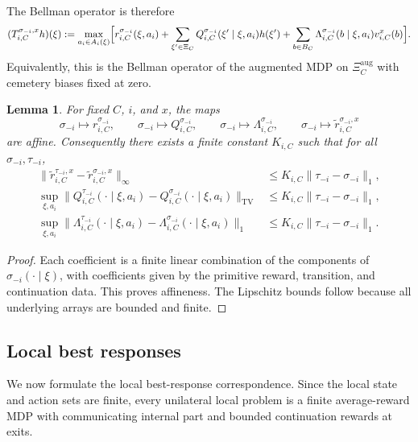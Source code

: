 \documentclass[12pt]{article}
\newtheorem{lemma}[theorem]{Lemma}
\theoremstyle{definition}
\newcommand{\1}{\mathbf{1}}
\begin{document}
The Bellman operator is therefore
\begin{equation}
\label{eq:Bellman-operator}
(T_{i,C}^{\sigma_{-i},x}h)(\xi)
:=
\max_{a_i\in A_i(\xi)}\Bigl[
 r_{i,C}^{\sigma_{-i}}(\xi,a_i)
 +\sum_{\xi'\in\Xi_C}Q_{i,C}^{\sigma_{-i}}(\xi'\mid\xi,a_i)h(\xi')
 +\sum_{b\in B_C}\Lambda_{i,C}^{\sigma_{-i}}(b\mid\xi,a_i)v_{i,C}^x(b)
 \Bigr].
\end{equation}
Equivalently, this is the Bellman operator of the augmented MDP on
$\Xi_C^{\mathrm{aug}}$ with cemetery biases fixed at zero.

\begin{lemma}
\label{lem:coeff-affine}
For fixed $C$, $i$, and $x$, the maps
\[
\sigma_{-i}\mapsto r_{i,C}^{\sigma_{-i}},
\qquad
\sigma_{-i}\mapsto Q_{i,C}^{\sigma_{-i}},
\qquad
\sigma_{-i}\mapsto \Lambda_{i,C}^{\sigma_{-i}},
\qquad
\sigma_{-i}\mapsto \widetilde r_{i,C}^{\sigma_{-i},x}
\]
are affine. Consequently there exists a finite constant $K_{i,C}$ such that for
all $\sigma_{-i},\tau_{-i}$,
\begin{align}
\|\widetilde r_{i,C}^{\tau_{-i},x}-\widetilde r_{i,C}^{\sigma_{-i},x}\|_\infty
&\le K_{i,C}\|\tau_{-i}-\sigma_{-i}\|_1,
\label{eq:r-lip}
\\
\sup_{\xi,a_i}\|Q_{i,C}^{\tau_{-i}}(\cdot\mid\xi,a_i)-Q_{i,C}^{\sigma_{-i}}(\cdot\mid\xi,a_i)\|_{\mathrm{TV}}
&\le K_{i,C}\|\tau_{-i}-\sigma_{-i}\|_1,
\label{eq:Q-lip}
\\
\sup_{\xi,a_i}\|\Lambda_{i,C}^{\tau_{-i}}(\cdot\mid\xi,a_i)-\Lambda_{i,C}^{\sigma_{-i}}(\cdot\mid\xi,a_i)\|_{1}
&\le K_{i,C}\|\tau_{-i}-\sigma_{-i}\|_1.
\label{eq:Lambda-lip}
\end{align}
\end{lemma}

\begin{proof}
Each coefficient is a finite linear combination of the components of
$\sigma_{-i}(\cdot\mid\xi)$, with coefficients given by the primitive reward,
transition, and continuation data. This proves affineness. The Lipschitz bounds
follow because all underlying arrays are bounded and finite.
\end{proof}

\subsection{Local best responses}

We now formulate the local best-response correspondence. Since the local state and
action sets are finite, every unilateral local problem is a finite average-reward
MDP with communicating internal part and bounded continuation rewards at exits.
\end{document}
